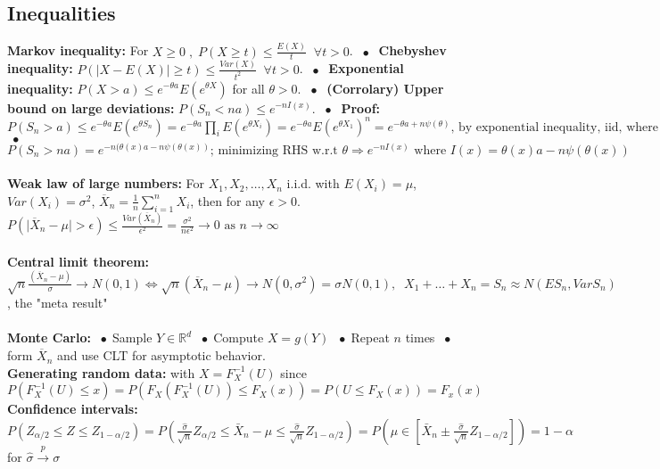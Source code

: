 \documentclass[9pt]{extarticle}
\newcommand{\abs}[1]{\lvert#1\rvert}
\newcommand*\bspace{$\; \bullet \;$}
\begin{document}
\subsection{Inequalities}
\textbf{Markov inequality: } For $X\geq 0 \;, \;P(X \geq t) \leq \frac{E(X)}{t} \; \; \forall t>0$. \bspace 
\textbf{Chebyshev inequality: } $P(\abs{X - E(X)} \geq t) \leq \frac{Var(X)}{t^2} \; \; \forall t > 0$. \bspace 
\textbf{Exponential inequality: } $P(X > a) \leq e^{-\theta a} E(e^{\theta X})$ for all $\theta > 0$. \bspace
\textbf{(Corrolary) Upper bound on large deviations: } $P(S_n < na) \leq e^{-nI(x)}$. \bspace
\textbf{Proof: } $P(S_n > a) \leq e^{-\theta a} E(e^{\theta S_n}) = e^{-\theta a} \prod_i E(e^{\theta X_i}) = e^{-\theta a} E(e^{\theta X_1})^n = e^{-\theta a + n \psi(\theta)} \textrm{, by exponential inequality, iid, where } \psi(\theta) = \log{Ee^{\theta X_1}}$ \bspace 
$P(S_n > na) = e^{-n(\theta(x) a - n \psi(\theta(x))} \textrm{; minimizing RHS w.r.t } \theta \Longrightarrow e^{-nI(x)} \textrm{ where } I(x) = \theta(x) a - n \psi(\theta(x))$\\\\
\textbf{Weak law of large numbers:} For $X_1, X_2, \dots, X_n$ i.i.d. with $E(X_i) = \mu$,  $Var(X_i) = \sigma^2$, $\overline{X}_n = \frac{1}{n}\sum_{i = 1}^n X_i$, then for any $\epsilon > 0$. $P(\abs{\overline{X}_n - \mu} > \epsilon) \leq \frac{Var(\overline{X}_n)}{\epsilon^2} = \frac{\sigma^2}{n\epsilon^2} \rightarrow 0 \textrm{ as } n \rightarrow \infty$\\\\
\textbf{Central limit theorem:} $\sqrt{n}\frac{(\overline{X}_n - \mu)}{\sigma} \longrightarrow N(0, 1) \Longleftrightarrow \sqrt{n}(\overline{X}_n - \mu) \longrightarrow N(0, \sigma^2) = \sigma N(0, 1), \; \; X_1 + \dots + X_n = S_n \approx N(E S_n, Var S_n)$, the "meta result"\\\\
\textbf{Monte Carlo: }\bspace Sample $Y \in \mathbb{R}^d$ \bspace Compute $X = g(Y)$ \bspace Repeat $n$ times \bspace form $\overline{X}_n$ and use CLT for asymptotic behavior.\\
\textbf{Generating random data:} with $X = F_X^{-1}(U)$ since $P(F_X^{-1}(U) \leq x) = P(F_X(F_X^{-1}(U)) \leq F_X(x)) = P(U \leq F_X(x)) = F_x(x)$\\
\textbf{Confidence intervals: } $P(Z_{\alpha / 2} \leq Z \leq Z_{1-\alpha / 2}) = P(\frac{\hat{\sigma}}{\sqrt{n}}Z_{\alpha/ 2} \leq \bar{X}_n - \mu \leq \frac{\hat{\sigma}}{\sqrt{n}}Z_{1-\alpha / 2}) = P(\mu \in \left[\bar{X}_n \pm \frac{\hat{\sigma}}{\sqrt{n}}Z_{1-\alpha/2}\right]) = 1-\alpha$ for $\hat{\sigma}\overset{p}{\longrightarrow} \sigma$\\
\end{document}
